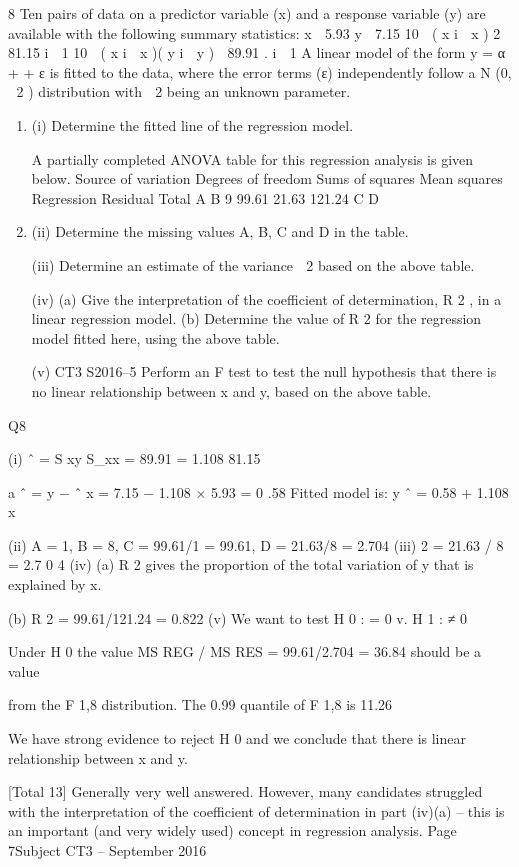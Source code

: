 \documentclass[a4paper,12pt]{article}
\begin{document}
8
Ten pairs of data on a predictor variable (x) and a response variable (y) are available
with the following summary statistics:
x  5.93 y  7.15
10
 ( x i  x ) 2  81.15
i  1
10
 ( x i  x )( y i  y )  89.91 .
i  1
A linear model of the form y = α + \betax + ε is fitted to the data, where the error
terms (ε) independently follow a N (0,  2 ) distribution with  2 being an unknown
parameter.
\begin{enumerate}
\item (i)
Determine the fitted line of the regression model.

A partially completed ANOVA table for this regression analysis is given below.
Source of
variation Degrees of
freedom Sums of
squares Mean
squares
Regression
Residual
Total A
B
9 99.61
21.63
121.24 C
D
\item (ii) Determine the missing values A, B, C and D in the table.

(iii) Determine an estimate of the variance  2 based on the above table.

(iv) (a) Give the interpretation of the coefficient of determination, R 2 , in a
linear regression model.
(b) Determine the value of R 2 for the regression model fitted here, using
the above table.

(v)
CT3 S2016–5
Perform an F test to test the null hypothesis that there is no linear relationship
between x and y, based on the above table.

\end{enumerate}
\newpage

Q8
\item (i)
\beta ˆ =
S xy
S_{xx}
=
89.91
= 1.108
81.15

a ˆ = y − \beta ˆ x = 7.15 − 1.108 × 5.93 = 0 .58 
Fitted model is: y ˆ = 0.58 + 1.108 x 
\item (ii) A = 1, B = 8, C = 99.61/1 = 99.61, D = 21.63/8 = 2.704 
(iii) \hat{\sigma} 2 = 21.63 / 8 = 2.7 0 4 
(iv) (a) R 2 gives the proportion of the total variation of y that is explained by x.

(b) R 2 = 99.61/121.24 = 0.822
(v)
We want to test H 0 : \beta= 0 v. H 1 : \beta ≠ 0


Under H 0 the value MS REG / MS RES = 99.61/2.704 = 36.84 should be a value

from the F 1,8 distribution.
The 0.99 quantile of F 1,8 is 11.26

We have strong evidence to reject H 0 and we conclude that there is linear relationship between x and y.

[Total 13]
Generally very well answered. However, many candidates struggled with the
interpretation of the coefficient of determination in part (iv)(a) – this is an
important (and very widely used) concept in regression analysis.
Page 7Subject CT3  – September 2016 
\end{document}
